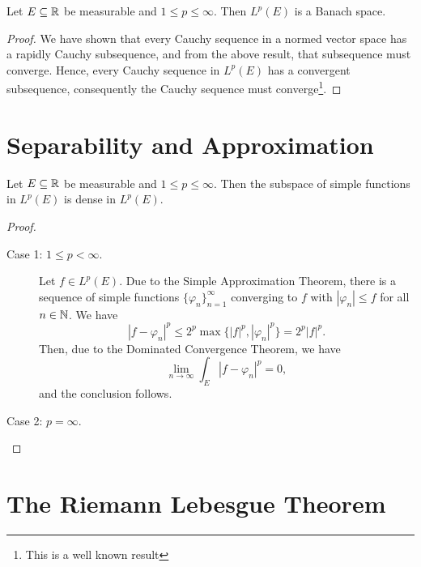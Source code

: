 \begin{theorem}
    Let $E\subseteq\mathbb{R}$ be measurable and $1\le p\le\infty$. Then $L^p(E)$ is a Banach space.
\end{theorem}
\begin{proof}
    We have shown that every Cauchy sequence in a normed vector space has a rapidly Cauchy subsequence, and from the above result, that subsequence must converge. Hence, every Cauchy sequence in $L^p(E)$ has a convergent subsequence, consequently the Cauchy sequence must converge\footnote{This is a well known result}.
\end{proof}

\section{Separability and Approximation}

\begin{proposition}
    Let $E\subseteq\mathbb{R}$ be measurable and $1\le p\le\infty$. Then the subspace of simple functions in $L^p(E)$ is dense in $L^p(E)$.
\end{proposition}
\begin{proof}
\begin{description}
    \item[Case 1: $1\le p < \infty$.] Let $f\in L^p(E)$. Due to the Simple Approximation Theorem, there is a sequence of simple functions $\{\varphi_n\}_{n = 1}^\infty$ converging to $f$ with $|\varphi_n|\le f$ for all $n\in\mathbb{N}$. We have 
    \begin{equation*}
        |f - \varphi_n|^p\le 2^p\max\{|f|^p,|\varphi_n|^p\} = 2^p|f|^p.
    \end{equation*}
    Then, due to the Dominated Convergence Theorem, we have 
    \begin{equation*}
        \lim_{n\to\infty}\int_E|f - \varphi_n|^p = 0,
    \end{equation*}
    and the conclusion follows.

    \item[Case 2: $p = \infty$.]\qedhere
\end{description}
\end{proof}

\section{The Riemann Lebesgue Theorem}

